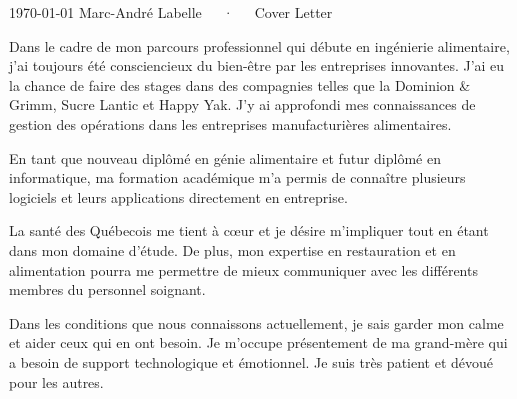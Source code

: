 \documentclass[letterpaper]{marckit-cv}
\begin{document}
\makecvheader[R]

\makecvfooter
  {\today}
  {Marc-André Labelle~~~·~~~Cover Letter}
  {}

\makelettertitle

\begin{cvletter}

    Dans le cadre de mon parcours professionnel qui débute
    en ingénierie alimentaire, j'ai toujours été
    consciencieux du bien-être par les entreprises innovantes.
    J’ai eu la chance de faire des stages dans des compagnies
    telles que la Dominion \& Grimm, Sucre Lantic et Happy Yak.
    J’y ai approfondi mes connaissances de gestion des opérations dans
    les entreprises manufacturières alimentaires.

    En tant que nouveau diplômé en génie alimentaire et futur diplômé
    en informatique, ma formation académique m’a permis de connaître
    plusieurs logiciels et leurs applications directement en entreprise.


    La santé des Québecois me tient à cœur et je désire m'impliquer tout en
    étant dans mon domaine d'étude. De plus, mon expertise en restauration
    et en alimentation pourra me permettre de mieux communiquer avec les
    différents membres du personnel soignant.

    Dans les conditions que nous connaissons actuellement,
    je sais garder mon calme et aider ceux qui en ont besoin.
    Je m'occupe présentement de ma grand-mère qui a besoin de support
    technologique et émotionnel. Je suis très patient et dévoué pour les autres.

\end{cvletter}


\makeletterclosing
\end{document}
